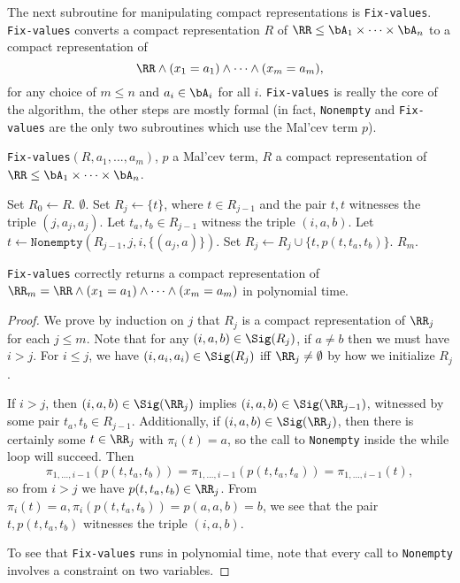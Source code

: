 The next subroutine for manipulating compact representations is \texttt{Fix-values}. \texttt{Fix-values} converts a compact representation $R$ of $\RR \le \bA_1\times \cdots\times \bA_n$ to a compact representation of
\[
\RR \wedge (x_1 = a_1) \wedge \cdots \wedge (x_m = a_m),
\]
for any choice of $m \le n$ and $a_i \in \bA_i$ for all $i$. \texttt{Fix-values} is really the core of the algorithm, the other steps are mostly formal (in fact, \texttt{Nonempty} and \texttt{Fix-values} are the only two subroutines which use the Mal'cev term $p$).

\begin{algorithm}
\caption{\texttt{Fix-values}$(R, a_1, ..., a_m)$, $p$ a Mal'cev term, $R$ a compact representation of $\RR \le \bA_1\times \cdots\times \bA_n$.}
\begin{algorithmic}[1]
\State Set $R_0 \gets R$.
\State \Return $\emptyset$.
\Else
\State Set $R_{j} \gets \{t\}$, where $t \in R_{j-1}$ and the pair $t,t$ witnesses the triple $(j,a_j,a_j)$.
\EndIf
\State Let $t_a,t_b \in R_{j-1}$ witness the triple $(i,a,b)$.%
\State Let $t \gets \texttt{Nonempty}(R_{j-1},j,i,\{(a_{j},a)\})$.
\State Set $R_{j} \gets R_{j} \cup \{t, p(t,t_a,t_b)\}$.
\EndIf
\EndFor
\EndFor
\State \Return $R_m$.
\end{algorithmic}
\end{algorithm}

\begin{prop} \texttt{Fix-values} correctly returns a compact representation of $\RR_m = \RR \wedge (x_1 = a_1) \wedge \cdots \wedge (x_m = a_m)$ in polynomial time.
\end{prop}
\begin{proof} We prove by induction on $j$ that $R_j$ is a compact representation of $\RR_j$ for each $j \le m$. Note that for any $(i,a,b) \in \Sig(R_j)$, if $a \ne b$ then we must have $i > j$. For $i \le j$, we have $(i,a_i,a_i) \in \Sig(R_j)$ iff $\RR_j \ne \emptyset$ by how we initialize $R_j$.

If $i > j$, then $(i,a,b) \in \Sig(\RR_j)$ implies $(i,a,b) \in \Sig(\RR_{j-1})$, witnessed by some pair $t_a,t_b \in R_{j-1}$. Additionally, if $(i,a,b) \in \Sig(\RR_j)$, then there is certainly some $t \in \RR_j$ with $\pi_i(t) = a$, so the call to \texttt{Nonempty} inside the while loop will succeed. Then
\[
\pi_{1,...,i-1}(p(t,t_a,t_b)) = \pi_{1,...,i-1}(p(t,t_a,t_a)) = \pi_{1, ..., i-1}(t),
\]
so from $i > j$ we have $p(t,t_a,t_b) \in \RR_j$. From $\pi_i(t) = a, \pi_i(p(t,t_a,t_b)) = p(a,a,b) = b$, we see that the pair $t,p(t,t_a,t_b)$ witnesses the triple $(i,a,b)$.

To see that \texttt{Fix-values} runs in polynomial time, note that every call to \texttt{Nonempty} involves a constraint on two variables.
\end{proof}


